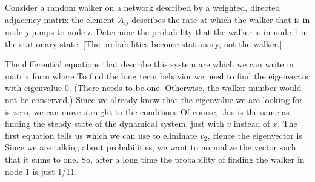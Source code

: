 Consider a random walker on a network described by a weighted, directed adjacency matrix 
the element $A_{ij}$ describes the rate at which the walker that is in node $j$ jumps to node $i$. Determine the probability that the walker is in node 1 in the stationary state. [The probabilities become stationary, not the walker.] 

\solution 
The differential equations that describe this system are 
which we can write in matrix form 
where 
To find the long term behavior we need to find the eigenvector with eigenvalue 0. (There needs to be one. Otherwise, the walker number would not be conserved.)
Since we already know that the eigenvalue we are looking for is zero, we can move straight to the conditions 
Of course, this is the same as finding the steady state of the dynamical system, just with $v$ instead of $x$. The first equation tells us 
which we can use to eliminate $v_2$,
Hence the eigenvector is 
Since we are talking about probabilities, we want to normalize the vector such that it sums to one. So, after a long time the probability of finding the walker in node 1 is just 1/11. 
